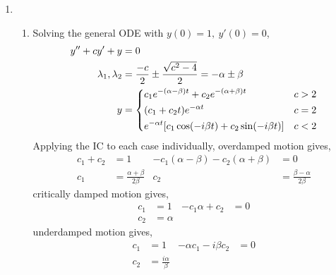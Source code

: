 \begin{enumerate}
    \item
          \begin{enumerate}
              \item Solving the general ODE with $ y(0) = 1,\ y'(0) = 0 $,
                    \begin{align}
                        y'' + cy' + y            & = 0                     \\
                        \lambda_{1}, \lambda_{2} & = \frac{-c}{2}
                        \pm \frac{\sqrt{c^{2} - 4}}{2} = -\alpha \pm \beta \\
                        y                        & =
                        \begin{dcases}
                            c_{1}e^{-(\alpha - \beta)t} + c_{2}e^{-(\alpha + \beta) t}
                             & c > 2 \\
                            (c_{1} + c_{2}t)e^{-\alpha t}
                             & c = 2 \\
                            e^{-\alpha t}[c_{1}\cos(-i\beta t) + c_{2} \sin(-i\beta t)]
                             & c < 2
                        \end{dcases}
                    \end{align}
                    Applying the IC to each case individually, overdamped motion gives,
                    \begin{align}
                        c_{1} + c_{2} & = 1                             &
                        -c_{1}(\alpha - \beta) - c_{2}(\alpha + \beta)
                                      & = 0                               \\
                        c_{1}         & = \frac{\alpha + \beta}{2\beta} &
                        c_{2}         & = \frac{\beta - \alpha}{2\beta}
                    \end{align}
                    critically damped motion gives,
                    \begin{align}
                        c_{1} & = 1      & -c_{1}\alpha + c_{2} & = 0 \\
                        c_{2} & = \alpha
                    \end{align}
                    underdamped motion gives,
                    \begin{align}
                        c_{1}                        & = 1                     &
                        -\alpha c_{1} - i\beta c_{2} & = 0                       \\
                        c_{2}                        & = \frac{i\alpha}{\beta}
                    \end{align}


\end{enumerate}
\end{enumerate}
